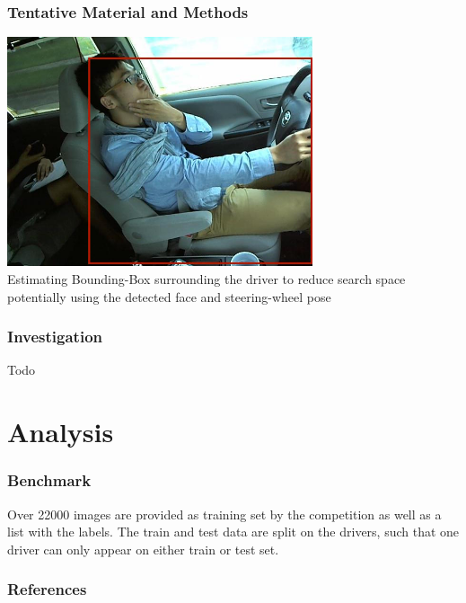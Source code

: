\documentclass{beamer}
\begin{document}
    \begin{frame}
		\frametitle{Tentative Material and Methods}
        \begin{center}
        \includegraphics[width=9cm]{images/BoundingBox.jpg}\\
        Estimating Bounding-Box surrounding the driver to reduce search space potentially using the detected face and steering-wheel pose\end{center}
    \end{frame}

	
	\begin{frame}
		\frametitle{Investigation}
		Todo
	\end{frame}
	
	\section{Analysis}	
	\begin{frame}
		\frametitle{Benchmark}
		Over 22000 images are provided as training set by the competition as well as a list with the labels. The train and test data are split on the drivers, such that one driver can only appear on either train or test set. 		


	\end{frame}

		
		


		
		\begin{frame}[allowframebreaks]
			\frametitle{References} 
			\nocite{*} 
			 
			 
		\end{frame}
		
		\medskip	
		

	
		
\end{document}
